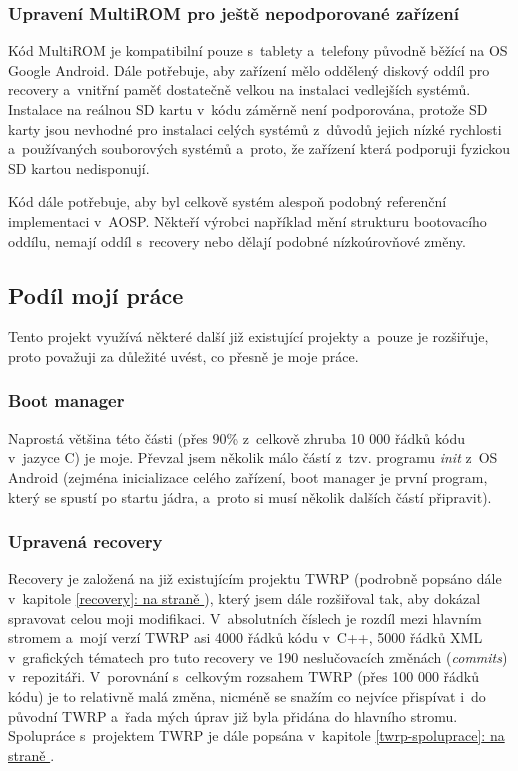\documentclass[12pt, a4paper, oneside]{article}
\newcommand{\It}{\textit}  %
\newcommand*{\fullref}[1]{\hyperref[{#1}]{\ref*{#1}: \uv{\nameref*{#1}} na straně \pageref{#1}}}
\begin{document}
\subsubsection{Upravení MultiROM pro ještě nepodporované zařízení}
Kód MultiROM je kompatibilní pouze s~tablety a~telefony původně běžící na OS Google Android. Dále potřebuje, aby zařízení mělo oddělený diskový oddíl pro recovery a~vnitřní paměť dostatečně velkou na instalaci vedlejších systémů. Instalace na reálnou SD kartu v~kódu záměrně není podporována, protože SD karty jsou nevhodné pro instalaci celých systémů z~důvodů jejich nízké rychlosti a~používaných souborových systémů a~proto, že zařízení která podporuji fyzickou SD kartou nedisponují.

Kód dále potřebuje, aby byl celkově systém alespoň podobný referenční implementaci v~AOSP. Někteří výrobci například mění strukturu bootovacího oddílu, nemají oddíl s~recovery nebo dělají podobné nízkoúrovňové změny.

\subsection{Podíl mojí práce}
Tento projekt využívá některé další již existující projekty a~pouze je rozšiřuje, proto považuji za důležité uvést, co přesně je moje práce.

\subsubsection{Boot manager}
Naprostá většina této části (přes 90\% z~celkově zhruba 10 000 řádků kódu v~jazyce C) je moje. Převzal jsem několik málo částí z~tzv. programu \It{init} z~OS Android (zejména inicializace celého zařízení, boot manager je první program, který se spustí po startu jádra, a~proto si musí několik dalších částí připravit).

\subsubsection{Upravená recovery}
Recovery je založená na již existujícím projektu TWRP (podrobně popsáno dále v~kapitole \fullref{recovery}), který jsem dále rozšiřoval tak, aby dokázal spravovat celou moji modifikaci. V~absolutních číslech je rozdíl mezi hlavním stromem a~mojí verzí TWRP asi 4000 řádků kódu  v~C++, 5000 řádků XML v~grafických tématech pro tuto recovery ve 190 neslučovacích změnách (\It{commits}) v~repozitáři. V~porovnání s~celkovým rozsahem TWRP (přes 100 000 řádků kódu) je to relativně malá změna, nicméně se snažím co nejvíce přispívat i~do původní TWRP a~řada mých úprav již byla přidána do hlavního stromu. Spolupráce s~projektem TWRP je dále popsána v~kapitole \fullref{twrp-spoluprace}.
\end{document}
